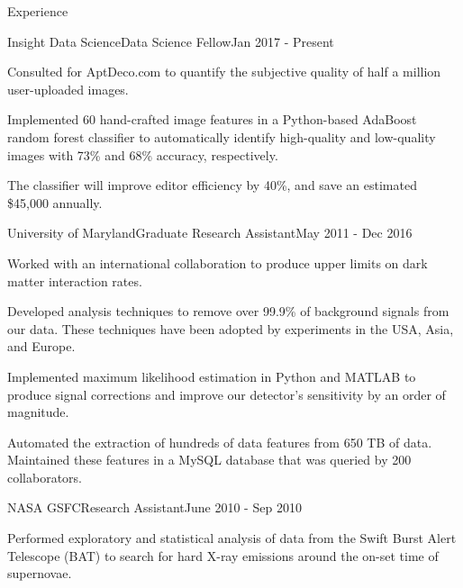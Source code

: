 \documentclass{resume} %
\begin{document}
\begin{rSection}{Experience}

\begin{rSubsection}{Insight Data Science}{Data Science Fellow}{Jan 2017 - Present}{}{ }
\item Consulted for AptDeco.com to quantify the subjective quality of half a million user-uploaded images.
\item Implemented 60 hand-crafted image features in a Python-based AdaBoost random forest classifier to automatically identify high-quality and low-quality images with 73\%  and 68\% accuracy, respectively.
\item The classifier will improve editor efficiency by 40\%, and save an estimated \$45,000 annually.
\end{rSubsection}


\begin{rSubsection}{University of Maryland}{Graduate Research Assistant}{May 2011 - Dec 2016}{}{ }

\item Worked with an international collaboration to produce upper limits on dark matter interaction rates.
\item Developed analysis techniques to remove over 99.9\% of background signals from our data. These techniques have been adopted by experiments in the USA, Asia, and Europe.
\item Implemented maximum likelihood estimation in Python and MATLAB to produce signal corrections and improve our detector's sensitivity by an order of magnitude.
\item Automated the extraction of hundreds of data features from 650 TB of data.  Maintained these features in a MySQL database that was queried by 200 collaborators.


\end{rSubsection}


\begin{rSubsection}{NASA GSFC}{Research Assistant}{June 2010 - Sep 2010}{}{}
\item Performed exploratory and statistical analysis of data from the Swift Burst Alert Telescope (BAT) to search for hard X-ray emissions around the on-set time of supernovae.
\end{rSubsection}

\end{rSection}
\end{document}
